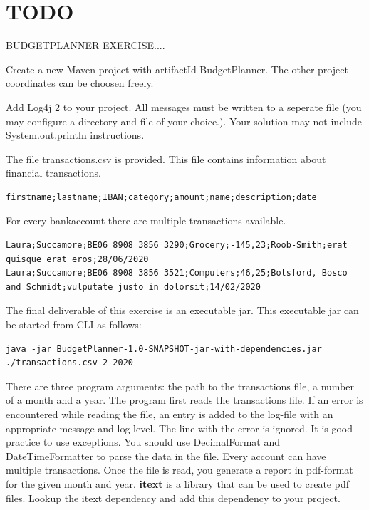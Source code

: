 \chapter{TODO}

BUDGETPLANNER EXERCISE....

\begin{oefening}
Create a new Maven project with artifactId BudgetPlanner.  The other project coordinates can be choosen freely.   

Add Log4j 2 to your project. All messages must be written to a seperate file (you may configure a directory and file of your choice.). Your solution may not include System.out.println instructions.
    
The file transactions.csv is provided. This file contains information about financial transactions. 
        
\begin{lstlisting}[frame=single]
firstname;lastname;IBAN;category;amount;name;description;date
\end{lstlisting}
    
For every bankaccount there are multiple transactions available.

\begin{lstlisting}[frame=single]
Laura;Succamore;BE06 8908 3856 3290;Grocery;-145,23;Roob-Smith;erat quisque erat eros;28/06/2020
Laura;Succamore;BE06 8908 3856 3521;Computers;46,25;Botsford, Bosco and Schmidt;vulputate justo in dolorsit;14/02/2020
\end{lstlisting}

The final deliverable of this exercise is an executable jar. This executable jar can be started from CLI as follows:

\begin{lstlisting}
java -jar BudgetPlanner-1.0-SNAPSHOT-jar-with-dependencies.jar ./transactions.csv 2 2020
\end{lstlisting}

There are three program arguments: the path to the transactions file, a number of a month and a year. 
The program first reads the transactions file. If an error is encountered while reading the file,  an entry is added to the log-file with an appropriate message and log level. The line with the error is ignored.
It is good practice to use exceptions. You should use DecimalFormat and DateTimeFormatter to parse the data in the file. Every account can have multiple transactions. Once the file is read, you generate a report in pdf-format for the given month and year. \textbf{itext} is a library that can be used to create pdf files.  Lookup the itext dependency and add this dependency to your project. 


\end{oefening}
